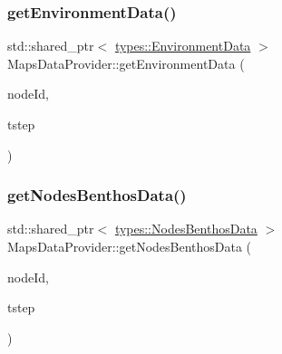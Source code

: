 \mbox{\label{class_maps_data_provider_a76657367c99e65974a84385f878a4b90}} 
\subsubsection{\texorpdfstring{getEnvironmentData()}{getEnvironmentData()}}
{\footnotesize\ttfamily std\+::shared\+\_\+ptr$<$ \mbox{\hyperlink{structtypes_1_1_environment_data}{types\+::\+Environment\+Data}} $>$ Maps\+Data\+Provider\+::get\+Environment\+Data (\begin{DoxyParamCaption}\item[{\mbox{\hyperlink{classtypes_1_1_node_id}{types\+::\+Node\+Id}}}]{node\+Id,  }\item[{\mbox{\hyperlink{namespacetypes_a9dc53a5ce11a196d82a6983030de8028}{types\+::tstep\+\_\+t}}}]{tstep }\end{DoxyParamCaption})}

\mbox{\label{class_maps_data_provider_a71e55ee06fc299a45ad90aef2e714653}} 
\subsubsection{\texorpdfstring{getNodesBenthosData()}{getNodesBenthosData()}}
{\footnotesize\ttfamily std\+::shared\+\_\+ptr$<$ \mbox{\hyperlink{structtypes_1_1_nodes_benthos_data}{types\+::\+Nodes\+Benthos\+Data}} $>$ Maps\+Data\+Provider\+::get\+Nodes\+Benthos\+Data (\begin{DoxyParamCaption}\item[{\mbox{\hyperlink{classtypes_1_1_node_id}{types\+::\+Node\+Id}}}]{node\+Id,  }\item[{\mbox{\hyperlink{namespacetypes_a9dc53a5ce11a196d82a6983030de8028}{types\+::tstep\+\_\+t}}}]{tstep }\end{DoxyParamCaption})}

\mbox{\label{class_maps_data_provider_a6173d4eb0bc44ad3b614fb9457ecb65c}} 
